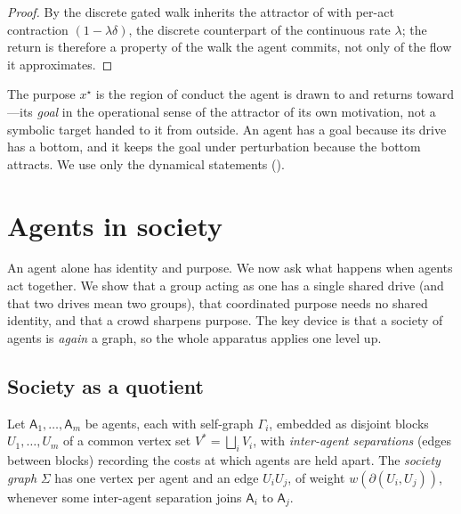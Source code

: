 \documentclass[11pt,twocolumn,a4paper]{article}
\newcommand{\Agent}{\mathsf{A}}
\newcommand{\Self}{\Gamma}          %
\newcommand{\V}{V}
\newcommand{\wt}{w}
\newcommand{\cut}{\partial}
\newcommand{\Soc}{\Sigma}            %
\begin{document}
\begin{proof}
By  the discrete gated walk inherits the attractor of
 with per-act contraction $(1-\lambda\delta)$, the
discrete counterpart of the continuous rate $\lambda$; the return is
therefore a property of the walk the agent commits, not only of the flow it
approximates.
\end{proof}

\begin{remark}
The purpose $x^\star$ is the region of conduct the agent is drawn to and
returns toward---its \emph{goal} in the operational sense of the attractor
of its own motivation, not a symbolic target handed to it from outside.
An agent has a goal because its drive has a bottom, and it keeps the goal
under perturbation because the bottom attracts. We use only the dynamical
statements ().
\end{remark}

\section{Agents in society}
\label{sec:society}

An agent alone has identity and purpose. We now ask what happens when
agents act together. We show that a group acting as one has a single
shared drive (and that two drives mean two groups), that coordinated
purpose needs no shared identity, and that a crowd sharpens purpose. The
key device is that a society of agents is \emph{again} a graph, so the
whole apparatus applies one level up.

\subsection{Society as a quotient}

\begin{definition}
\label{def:society}
Let $\Agent_1,\dots,\Agent_m$ be agents, each with self-graph $\Self_i$,
embedded as disjoint blocks $U_1,\dots,U_m$ of a common vertex set
$\V^\ast=\bigsqcup_i\V_i$, with \emph{inter-agent separations} (edges
between blocks) recording the costs at which agents are held apart. The
\emph{society graph} $\Soc$ has one vertex per agent and an edge
$U_iU_j$, of weight $\wt(\cut(U_i,U_j))$, whenever some inter-agent
separation joins $\Agent_i$ to $\Agent_j$.
\end{definition}
\end{document}
